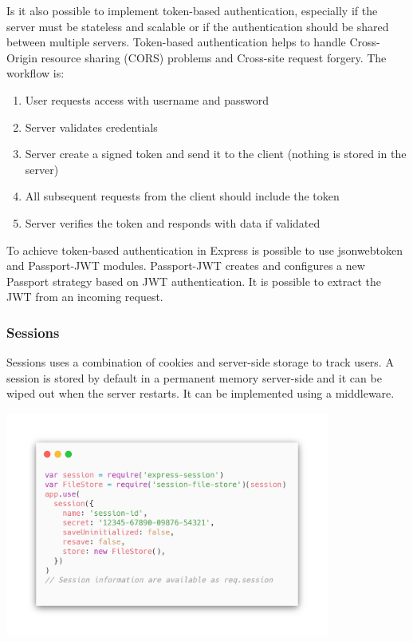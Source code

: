 Is it also possible to implement token-based authentication, especially if the server must be stateless and scalable or if the authentication should be shared between multiple servers. Token-based authentication helps to handle Cross-Origin resource sharing (CORS) problems and Cross-site request forgery.
The workflow is:
\begin{enumerate}
    \item User requests access with username and password
    \item Server validates credentials
    \item Server create a signed token and send it to the client (nothing is stored in the server)
    \item All subsequent requests from the client should include the token
    \item Server verifies the token and responds with data if validated
\end{enumerate}

To achieve token-based authentication in Express is possible to use jsonwebtoken and Passport-JWT modules. Passport-JWT creates and configures a new Passport strategy based on JWT authentication. It is possible to extract the JWT from an incoming request.

\subsubsection*{Sessions}
Sessions uses a combination of cookies and server-side storage to track users. A session is stored by default in a permanent memory server-side and it can be wiped out when the server restarts. It can be implemented using a middleware.

\begin{center}
    \includegraphics[width=0.8\textwidth]{assets/session.png}
    \label{fig:session}
\end{center}


